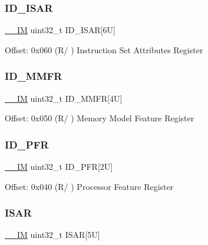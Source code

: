 \subsubsection{\texorpdfstring{I\+D\+\_\+\+I\+S\+AR}{ID\_ISAR}}
{\footnotesize\ttfamily \mbox{\hyperlink{core__cm4_8h_a4cc1649793116d7c2d8afce7a4ffce43}{\+\_\+\+\_\+\+IM}} uint32\+\_\+t I\+D\+\_\+\+I\+S\+AR\mbox{[}6\+U\mbox{]}}

Offset\+: 0x060 (R/ ) Instruction Set Attributes Register \mbox{\label{struct_s_c_b___type_a6a3474c4944f3e007cc3a9dc28b76650}} 
\subsubsection{\texorpdfstring{I\+D\+\_\+\+M\+M\+FR}{ID\_MMFR}}
{\footnotesize\ttfamily \mbox{\hyperlink{core__cm4_8h_a4cc1649793116d7c2d8afce7a4ffce43}{\+\_\+\+\_\+\+IM}} uint32\+\_\+t I\+D\+\_\+\+M\+M\+FR\mbox{[}4\+U\mbox{]}}

Offset\+: 0x050 (R/ ) Memory Model Feature Register \mbox{\label{struct_s_c_b___type_a37569b15cd2c9a50691e8b5e15a1d129}} 
\subsubsection{\texorpdfstring{I\+D\+\_\+\+P\+FR}{ID\_PFR}}
{\footnotesize\ttfamily \mbox{\hyperlink{core__cm4_8h_a4cc1649793116d7c2d8afce7a4ffce43}{\+\_\+\+\_\+\+IM}} uint32\+\_\+t I\+D\+\_\+\+P\+FR\mbox{[}2\+U\mbox{]}}

Offset\+: 0x040 (R/ ) Processor Feature Register \mbox{\label{struct_s_c_b___type_af2950df748750d535d5d65ac1c209563}} 
\subsubsection{\texorpdfstring{I\+S\+AR}{ISAR}}
{\footnotesize\ttfamily \mbox{\hyperlink{core__cm4_8h_a4cc1649793116d7c2d8afce7a4ffce43}{\+\_\+\+\_\+\+IM}} uint32\+\_\+t I\+S\+AR\mbox{[}5\+U\mbox{]}}

